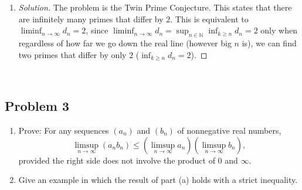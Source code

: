 \documentclass{article}
\newcommand{\N}{{\mathbb N}}
\begin{document}
\begin{enumerate}
\begin{enumerate}
\begin{proof}[Solution]
			Thus, let $k \in \N$.
			Note that $(k+1)! + 2, (k+1)! + 3, \dots, (k+1)! + k + 1
			= \{(k+1)! + j \colon 2 \leq j \leq k+1\}$
			are $k$ consecutive integers.
			Furthermore, $(k+1)! + j$ is divisible by $j \neq 1$,
			since $j \leq k + 1$, and so $j \mid (k+1)!$ 
			(by definition of the factorial)
			and $j \mid j$.
			Thus, all of the consecutive integers are not prime.
			So we are done.
		\end{proof}
		\item \begin{proof}[Solution]\let\qed\relax
			The problem is the Twin Prime Conjecture.
			This states that there are infinitely many primes
			that differ by $2$.
			This is equivalent to $\liminf_{n\to\infty}d_n = 2$,
			since $\liminf_{n\to\infty}d_n = \sup_{n\in\N} \inf_{k\geq n} d_n = 2$
			only when regardless of how far we go down the real line
			(however big $n$ is),
			we can find two primes that differ by only $2$ ($\inf_{k\geq n} d_n = 2$).
		\end{proof}
	\end{enumerate}
\end{enumerate}
\clearpage
~\clearpage

\subsection*{Problem 3}
{\it \begin{enumerate}
	\item Prove: For any sequences $(a_n)$ and $(b_n)$ of nonnegative real numbers,
		\[
			\limsup_{n\to\infty}(a_nb_n) \leq \left(\limsup_{n\to\infty}a_n\right)
			\left(\limsup_{n\to\infty} b_n\right),
		\]
		provided the right side does not involve the product of $0$ and $\infty$.
	\item Give an example in which the result of part (a) holds with a strict inequality.
\end{enumerate}}
\end{document}

